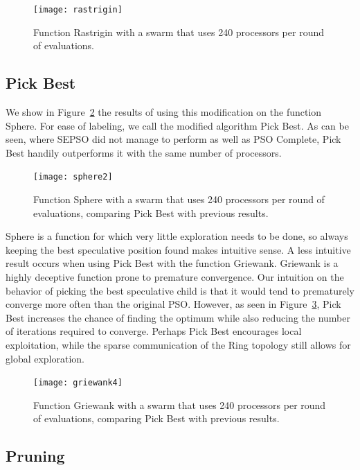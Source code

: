 \documentclass[journal,letterpaper]{IEEEtran}
\newcommand{\fig}[1]{Figure~\ref{fig:#1}}
\begin{document}
\begin{figure}
  \centering
  \texttt{[image: rastrigin]}
  \caption{Function Rastrigin with a swarm that uses 240 processors per round
  of evaluations.}
  \label{fig:rastrigin}
\end{figure}



\subsection{Pick Best}

We show in \fig{sphere-pickbest} the results of using this modification on the
function Sphere.  For ease of labeling, we call the modified algorithm Pick
Best.  As can be seen, where SEPSO did not manage to perform as well as PSO
Complete, Pick Best handily outperforms it with the same number of processors.

\begin{figure}
  \centering
  \texttt{[image: sphere2]}
  \caption{Function Sphere with a swarm that uses 240 processors per round of
  evaluations, comparing Pick Best with previous results.}
  \label{fig:sphere-pickbest}
\end{figure}

Sphere is a function for which very little exploration needs to be done, so
always keeping the best speculative position found makes intuitive sense.  A
less intuitive result occurs when using Pick Best with the function Griewank.
Griewank is a highly deceptive function prone to premature convergence.  Our
intuition on the behavior of picking the best speculative child is that it
would tend to prematurely converge more often than the original PSO.  However,
as seen in \fig{griewank-pickbest}, Pick Best increases the chance of finding
the optimum while also reducing the number of iterations required to converge.
Perhaps Pick Best encourages local exploitation, while the sparse communication
of the Ring topology still allows for global exploration.

\begin{figure}
  \centering
  \texttt{[image: griewank4]}
  \caption{Function Griewank with a swarm that uses 240 processors per round of
  evaluations, comparing Pick Best with previous results.}
  \label{fig:griewank-pickbest}
\end{figure}


\subsection{Pruning}
\end{document}
